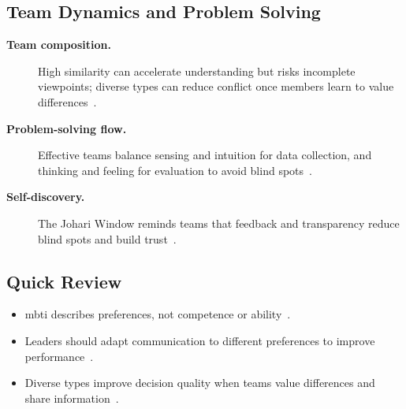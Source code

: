 \documentclass[../main.tex]{subfiles}
\begin{document}
\subsection{Team Dynamics and Problem Solving}
\begin{description}
  \item[\textbf{Team composition.}] High similarity can accelerate understanding but risks incomplete viewpoints; diverse types can reduce conflict once members learn to value differences~\autocite{edo-5-1-8-mbti-2025}.
  \item[\textbf{Problem-solving flow.}] Effective teams balance sensing and intuition for data collection, and thinking and feeling for evaluation to avoid blind spots~\autocite{edo-5-1-8-mbti-2025}.
  \item[\textbf{Self-discovery.}] The Johari Window reminds teams that feedback and transparency reduce blind spots and build trust~\autocite{edo-5-1-8-mbti-2025}.
\end{description}

\subsection{Quick Review}
\begin{itemize}
  \item \ac{mbti} describes preferences, not competence or ability~\autocite{edo-5-1-8-mbti-2025}.
  \item Leaders should adapt communication to different preferences to improve performance~\autocite{edo-5-1-8-mbti-2025}.
  \item Diverse types improve decision quality when teams value differences and share information~\autocite{edo-5-1-8-mbti-2025}.
\end{itemize}

\end{document}
